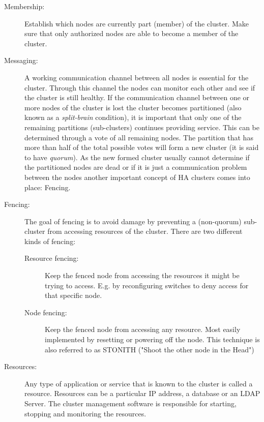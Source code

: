 \documentclass[a4paper,11pt,DIV=12]{scrartcl}
\begin{document}
    \begin{description}
        \item [Membership:]
            Establish which nodes are currently part (member) of the cluster.
            Make sure that only authorized nodes are able to become a member
            of the cluster.
        \item [Messaging:]
            A working communication channel between all nodes is essential for
            the cluster. Through this channel the nodes can monitor each other
            and see if the cluster is still healthy.  If the communication
            channel between one or more nodes of the cluster is lost the
            cluster becomes partitioned (also known as a \emph{split-brain}
            condition), it is important that only one of the remaining
            partitions (sub-clusters) continues providing service.  This can
            be determined through a vote of all remaining nodes. The
            partition that has more than half of the total possible votes will
            form a new cluster (it is said to have \emph{quorum}). As the new
            formed cluster usually cannot determine if the partitioned nodes
            are dead or if it is just a communication problem between the nodes
            another important concept of HA clusters comes into place: Fencing.
        \item [Fencing:]
            The goal of fencing is to avoid damage by preventing a
            (non-quorum) sub-cluster from accessing resources of the cluster.
            There are two different kinds of fencing:
            \begin{description}
                \item [Resource fencing:]
                    Keep the fenced node from accessing the resources it might
                    be trying to access. E.g. by reconfiguring switches to deny
                    access for that specific node.
                \item [Node fencing:]
                    Keep the fenced node from accessing any resource. Most
                    easily implemented by resetting or powering off the node.
                    This technique is also referred to as STONITH ("Shoot the
                    other node in the Head")
            \end{description}
        \item [Resources:]
            Any type of application or service that is known to the cluster is
            called a resource. Resources can be a particular IP address, a
            database or an LDAP Server. The cluster management software is
            responsible for starting, stopping and monitoring the resources.
    \end{description}
\end{document}

